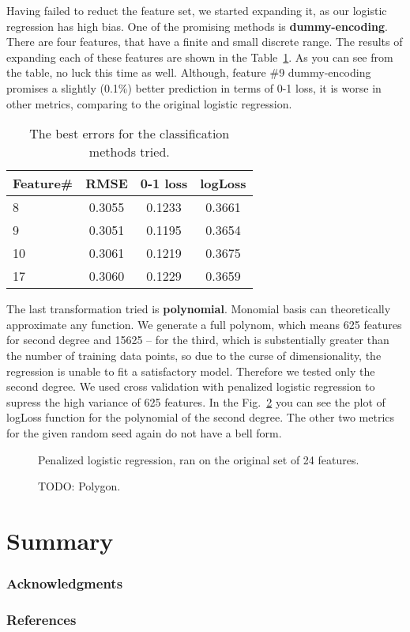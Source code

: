\documentclass{article} %
\newcommand{\todo}[1]{}
\renewcommand{\todo}[1]{{\color{red} TODO: {#1}}}
\begin{document}
Having failed to reduct the feature set, we started expanding it, as our logistic regression has high bias. One of the promising methods is {\bf dummy-encoding}. There are four features, that have a finite and small discrete range. The results of expanding each of these features are shown in the Table~\ref{tab:classification-dummy}. As you can see from the table, no luck this time as well. Although, feature \#9 dummy-encoding promises a slightly (0.1\%) better prediction in terms of 0-1 loss, it is worse in other metrics, comparing to the original logistic regression.
\begin{table}[h]
  \begin{center}
    \begin{tabular}{l|ccc}
      Feature\# & RMSE & 0-1 loss & logLoss \\
      \hline
      8 & 0.3055 & 0.1233 & 0.3661 \\
      9 & 0.3051 & 0.1195 & 0.3654 \\
      10 & 0.3061 & 0.1219 & 0.3675 \\
      17 & 0.3060 & 0.1229 & 0.3659
    \end{tabular}
    \caption{The best errors for the classification methods tried.}
    \label{tab:classification-dummy}
  \end{center}
\end{table}

The last transformation tried is {\bf polynomial}. Monomial basis can theoretically approximate any function. We generate a full polynom, which means 625 features for second degree and 15625 -- for the third, which is substentially greater than the number of training data points, so due to the curse of dimensionality, the regression is unable to fit a satisfactory model. Therefore we tested only the second degree. We used cross validation with penalized logistic regression to supress the high variance of 625 features. In the Fig.~\ref{fig:polyErrors} you can see the plot of logLoss function for the polynomial of the second degree. The other two metrics for the given random seed again do not have a bell form.

\begin{figure}[!t]
\center
\caption{Penalized logistic regression, ran on the original set of 24 features.}
\label{fig:penLLmisses}
\end{figure}


\begin{figure}[!t]
\center
\caption{\todo{Polygon.}}
\label{fig:polyErrors}
\end{figure}



\section{Summary}

\subsubsection*{Acknowledgments}

\subsubsection*{References}
\end{document}
